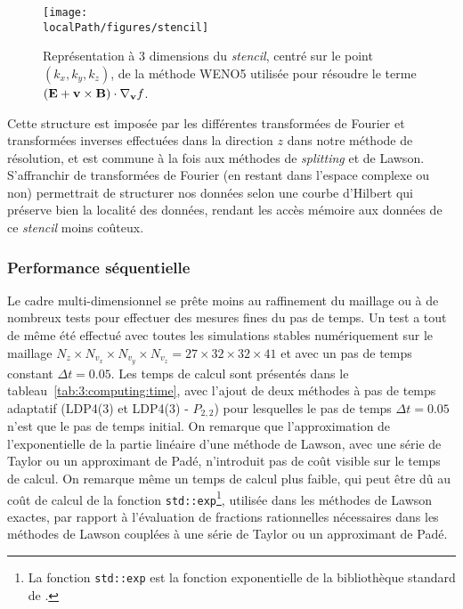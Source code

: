 \begin{figure}
  \centering
  \texttt{[image: \\localPath/figures/stencil]}
  \caption{Représentation à 3 dimensions du \emph{stencil}, centré sur le point $(k_x,k_y,k_z)$, de la méthode WENO5 utilisée pour résoudre le terme $(\vb{E}+\vb{v}\times\vb{B})\cdot\nabla_{\vb{v}}f$.}
  \label{fig:3:stencil}
\end{figure}

Cette structure est imposée par les différentes transformées de Fourier et transformées inverses effectuées dans la direction $z$ dans notre méthode de résolution, et est commune à la fois aux méthodes de \emph{splitting} et de Lawson. S'affranchir de transformées de Fourier (en restant dans l'espace complexe ou non) permettrait de structurer nos données selon une courbe d'Hilbert qui préserve bien la localité des données, rendant les accès mémoire aux données de ce \emph{stencil} moins coûteux.

\subsubsection{Performance séquentielle}

Le cadre multi-dimensionnel se prête moins au raffinement du maillage ou à de nombreux tests pour effectuer des mesures fines du pas de temps. Un test a tout de même été effectué avec toutes les simulations stables numériquement sur le maillage $N_z \times N_{v_x} \times N_{v_y} \times N_{v_z}=27\times32\times32\times41$ et avec un pas de temps constant $\Delta t=0.05$. Les temps de calcul sont présentés dans le tableau~\ref{tab:3:computing:time}, avec l'ajout de deux méthodes à pas de temps adaptatif (LDP4(3) et LDP4(3) - $P_{2,2}$) pour lesquelles le pas de temps $\Delta t=0.05$ n'est que le pas de temps initial. On remarque que l'approximation de l'exponentielle de la partie linéaire d'une méthode de Lawson, avec une série de Taylor ou un approximant de Padé, n'introduit pas de coût visible sur le temps de calcul. On remarque même un temps de calcul plus faible, qui peut être dû au coût de calcul de la fonction \texttt{std::exp}\footnote{La fonction \CC{} \texttt{std::exp} est la fonction exponentielle de la bibliothèque standard de \CC{}.}, utilisée dans les méthodes de Lawson exactes, par rapport à l'évaluation de fractions rationnelles nécessaires dans les méthodes de Lawson couplées à une série de Taylor ou un approximant de Padé.

